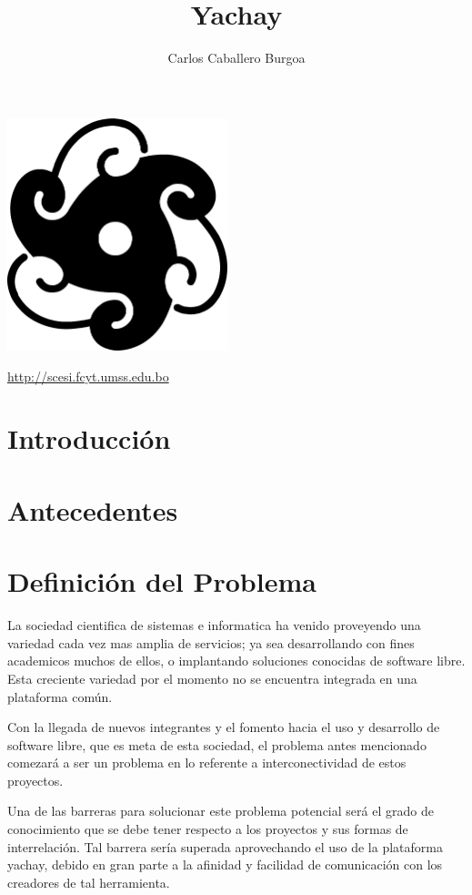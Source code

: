 \documentclass[letter,12pt]{article}
\title{\bf Yachay}
\author{Carlos Caballero Burgoa}
\begin{document}
\maketitle
\begin{center}\includegraphics[width=0.48\textwidth]{yachay.png}\end{center}
\begin{center}\url {http://scesi.fcyt.umss.edu.bo}\end{center}
\pagebreak

\tableofcontents
\pagebreak

\section{Introducción}

\section{Antecedentes}


\section{Definición del Problema}
La sociedad cientifica de sistemas e informatica ha venido proveyendo una variedad cada vez mas
amplia de servicios; ya sea desarrollando con fines academicos muchos de ellos, o implantando
soluciones conocidas de software libre. Esta creciente variedad por el momento no se encuentra
integrada en una plataforma común.

Con la llegada de nuevos integrantes y el fomento hacia el uso y desarrollo de software libre, que
es meta de esta sociedad, el problema antes mencionado comezará a ser un problema en lo referente a
interconectividad de estos proyectos.

Una de las barreras para solucionar este problema potencial será el grado de conocimiento que se
debe tener respecto a los proyectos y sus formas de interrelación. Tal barrera sería superada
aprovechando el uso de la plataforma yachay, debido en gran parte a la afinidad y facilidad de
comunicación con los creadores de tal herramienta.
\end{document}
